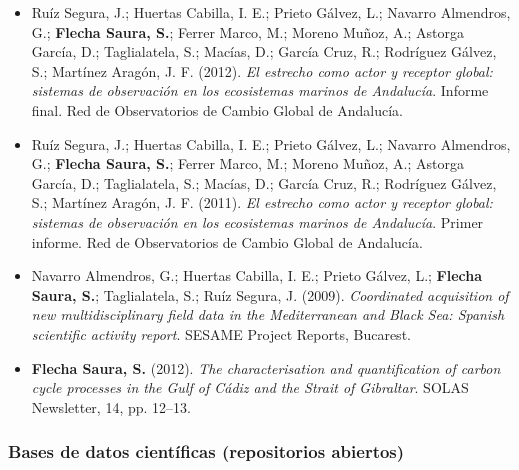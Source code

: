 \documentclass[11pt,a4paper]{article}
\begin{document}
\begin{itemize}[leftmargin=*]

    \item Ruíz Segura, J.; Huertas Cabilla, I. E.; Prieto Gálvez, L.; Navarro Almendros, G.; \textbf{Flecha Saura, S.}; Ferrer Marco, M.; Moreno Muñoz, A.; Astorga García, D.; Taglialatela, S.; Macías, D.; García Cruz, R.; Rodríguez Gálvez, S.; Martínez Aragón, J. F. (2012). 
    \textit{El estrecho como actor y receptor global: sistemas de observación en los ecosistemas marinos de Andalucía}. 
    Informe final. Red de Observatorios de Cambio Global de Andalucía.

    \item Ruíz Segura, J.; Huertas Cabilla, I. E.; Prieto Gálvez, L.; Navarro Almendros, G.; \textbf{Flecha Saura, S.}; Ferrer Marco, M.; Moreno Muñoz, A.; Astorga García, D.; Taglialatela, S.; Macías, D.; García Cruz, R.; Rodríguez Gálvez, S.; Martínez Aragón, J. F. (2011). 
    \textit{El estrecho como actor y receptor global: sistemas de observación en los ecosistemas marinos de Andalucía}. 
    Primer informe. Red de Observatorios de Cambio Global de Andalucía.

    \item Navarro Almendros, G.; Huertas Cabilla, I. E.; Prieto Gálvez, L.; \textbf{Flecha Saura, S.}; Taglialatela, S.; Ruíz Segura, J. (2009). 
    \textit{Coordinated acquisition of new multidisciplinary field data in the Mediterranean and Black Sea: Spanish scientific activity report}. 
    SESAME Project Reports, Bucarest.

    \item \textbf{Flecha Saura, S.} (2012). 
    \textit{The characterisation and quantification of carbon cycle processes in the Gulf of Cádiz and the Strait of Gibraltar}. 
    SOLAS Newsletter, 14, pp. 12--13.

\end{itemize}

\subsubsection{Bases de datos científicas (repositorios abiertos)}
\end{document}
